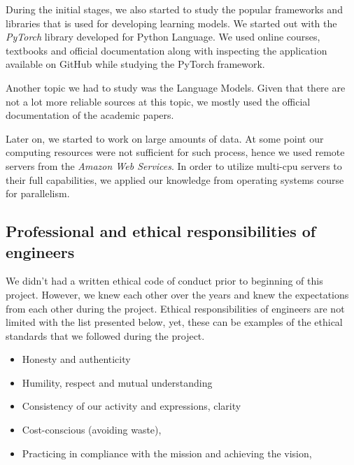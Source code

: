 \documentclass{mefsdp}
\begin{document}
	During the initial stages, we also started to study the popular frameworks and libraries that is used for developing learning models. We started out with the \textit{PyTorch} library developed for Python Language. We used online courses, textbooks and official documentation along with inspecting the application available on GitHub while studying the PyTorch framework. \newline \par
	
	Another topic we had to study was the Language Models. Given that there are not a lot more reliable sources at this topic, we mostly used the official documentation of the academic papers.\newline \par
	
	Later on, we started to work on large amounts of data. At some point our computing resources were not sufficient for such process, hence we used remote servers from the \textit{Amazon Web Services}. In order to utilize multi-cpu servers to their full capabilities, we applied our knowledge from operating systems course for parallelism. \newline \par
	
	\subsection{Professional and ethical responsibilities of engineers}
	
	We didn't had a written ethical code of conduct prior to beginning of this project. However, we knew each other over the years and knew the expectations from each other during the project.
	Ethical responsibilities of engineers are not limited with the list presented below, yet, these can be examples of the ethical standards that we followed during the project.
	
	\begin{itemize}
		\item	Honesty and authenticity
		\item	Humility, respect and mutual understanding
		\item	Consistency of our activity and expressions, clarity
		\item	Cost-conscious (avoiding waste),
		\item	Practicing in compliance with the mission and achieving the vision,
	\end{itemize}
\end{document}
